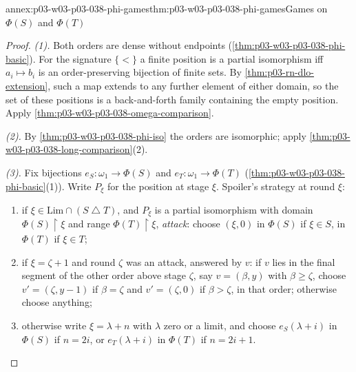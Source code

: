 \begin{annexitem}{annex:p03-w03-p03-038-phi-games}{thm:p03-w03-p03-038-phi-games}{Games on \(\Phi(S)\) and \(\Phi(T)\)}
\begin{proof}
\emph{(1).} Both orders are dense without endpoints
(\cref{thm:p03-w03-p03-038-phi-basic}). For the signature \(\{<\}\) a finite
position is a partial isomorphism iff \(a_i\mapsto b_i\) is an
order-preserving bijection of finite sets. By
\cref{thm:p03-rn-dlo-extension}, such a map extends to any further element
of either domain, so the set of these positions is a back-and-forth family
containing the empty position. Apply
\cref{thm:p03-w03-p03-038-omega-comparison}.

\emph{(2).} By \cref{thm:p03-w03-p03-038-phi-iso} the orders are isomorphic;
apply \cref{thm:p03-w03-p03-038-long-comparison}(2).

\emph{(3).} Fix bijections \(e_S:\omega_1\to\Phi(S)\) and
\(e_T:\omega_1\to\Phi(T)\) (\cref{thm:p03-w03-p03-038-phi-basic}(1)). Write
\(P_\xi\) for the position at stage \(\xi\). Spoiler's strategy at round
\(\xi\):
\begin{enumerate}
\item[(a)] if \(\xi\in\mathrm{Lim}\cap(S\mathbin{\triangle}T)\), and \(P_\xi\)
      is a partial isomorphism with domain \(\Phi(S)\mathbin{\upharpoonright}\xi\)
      and range \(\Phi(T)\mathbin{\upharpoonright}\xi\), \emph{attack}: choose
      \((\xi,0)\) in \(\Phi(S)\) if \(\xi\in S\), in \(\Phi(T)\) if \(\xi\in T\);
\item[(b)] if \(\xi=\zeta+1\) and round \(\zeta\) was an attack, answered by
      \(v\): if \(v\) lies in the final segment of the other order above stage
      \(\zeta\), say \(v=(\beta,y)\) with \(\beta\ge\zeta\), choose \(v'=(\zeta,y-1)\)
      if \(\beta=\zeta\) and \(v'=(\zeta,0)\) if \(\beta>\zeta\), in that order;
      otherwise choose anything;
\item[(c)] otherwise write \(\xi=\lambda+n\) with \(\lambda\) zero or a limit,
      and choose \(e_S(\lambda+i)\) in \(\Phi(S)\) if \(n=2i\), or
      \(e_T(\lambda+i)\) in \(\Phi(T)\) if \(n=2i+1\).
\end{enumerate}


\end{proof}
\end{annexitem}
